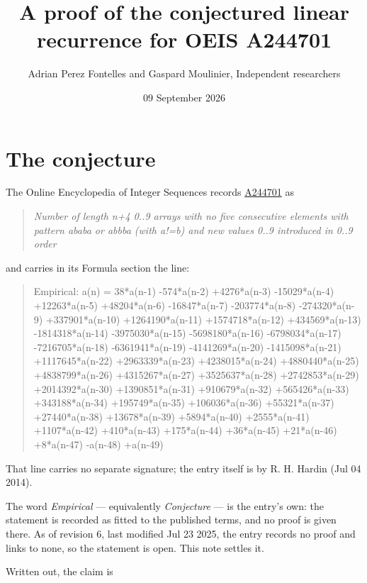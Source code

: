 \documentclass[11pt]{article}
\title{A proof of the conjectured linear recurrence for OEIS A244701}
\author{Adrian Perez Fontelles and Gaspard Moulinier, Independent researchers}
\date{09 September 2026}
\theoremstyle{definition}
\begin{document}
\maketitle
\section{The conjecture}

The Online Encyclopedia of Integer Sequences records \href{https://oeis.org/A244701}{A244701} as

\begin{quote}\itshape Number of length n+4 0..9 arrays with no five consecutive elements with pattern ababa or abbba (with a!=b) and new values 0..9 introduced in 0..9 order\end{quote}

and carries in its Formula section the line:

\begin{quote}\ttfamily Empirical: a(n) = 38*a(n-1) -574*a(n-2) +4276*a(n-3) -15029*a(n-4) +12263*a(n-5) +48204*a(n-6) -16847*a(n-7) -203774*a(n-8) -274320*a(n-9) +337901*a(n-10) +1264190*a(n-11) +1574718*a(n-12) +434569*a(n-13) -1814318*a(n-14) -3975030*a(n-15) -5698180*a(n-16) -6798034*a(n-17) -7216705*a(n-18) -6361941*a(n-19) -4141269*a(n-20) -1415098*a(n-21) +1117645*a(n-22) +2963339*a(n-23) +4238015*a(n-24) +4880440*a(n-25) +4838799*a(n-26) +4315267*a(n-27) +3525637*a(n-28) +2742853*a(n-29) +2014392*a(n-30) +1390851*a(n-31) +910679*a(n-32) +565426*a(n-33) +343188*a(n-34) +195749*a(n-35) +106036*a(n-36) +55321*a(n-37) +27440*a(n-38) +13678*a(n-39) +5894*a(n-40) +2555*a(n-41) +1107*a(n-42) +410*a(n-43) +175*a(n-44) +36*a(n-45) +21*a(n-46) +8*a(n-47) -a(n-48) +a(n-49)\end{quote}

That line carries no separate signature; the entry itself is by R. H. Hardin (Jul 04 2014).

The word {\itshape Empirical} --- equivalently {\itshape Conjecture} --- is the entry's own: the statement is recorded as fitted to the published terms, and no proof is given there. As of revision 6, last modified Jul 23 2025, the entry records no proof and links to none, so the statement is open. This note settles it.

Written out, the claim is
\end{document}
